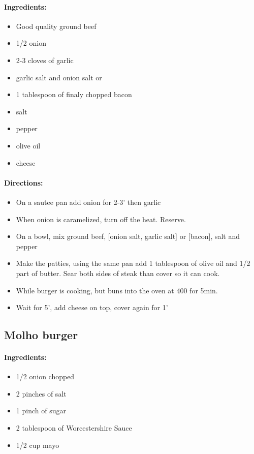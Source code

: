 \documentclass{article}
\begin{document}
\paragraph{Ingredients:}
\begin{itemize}
    \item Good quality ground beef
    \item 1/2 onion
    \item 2-3 cloves of garlic
    \item garlic salt and onion salt or
    \item 1 tablespoon of finaly chopped bacon
    \item salt
    \item pepper
    \item olive oil
    \item cheese
\end{itemize}

\paragraph{Directions:}
\begin{itemize}
    \item On a sautee pan add onion for 2-3' then garlic
    \item When onion is caramelized, turn off the heat. Reserve.
    \item On a bowl, mix ground beef, [onion salt, garlic salt] or [bacon], salt and pepper
    \item Make the patties, using the same pan add 1 tablespoon of olive oil and 1/2 part of butter. Sear both sides of steak than cover so it can cook.
    \item While burger is cooking, but buns into the oven at 400 for 5min.
    \item Wait for 5', add cheese on top, cover again for 1'
\end{itemize}

\subsection{Molho burger}

\paragraph{Ingredients:}
\begin{itemize}
    \item 1/2 onion chopped
    \item 2 pinches of salt
    \item 1 pinch of sugar
    \item 2 tablespoon of Worcestershire Sauce
    \item 1/2 cup mayo
\end{itemize}
\end{document}
